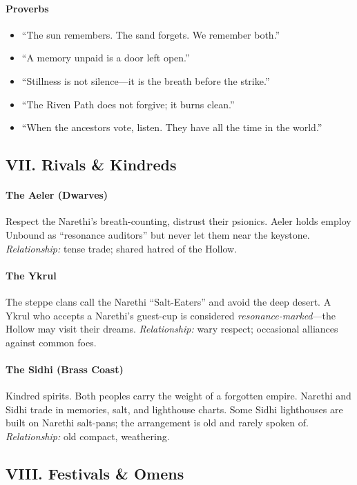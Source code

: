 \documentclass[11pt]{article}
\begin{document}
\paragraph{Proverbs}
\begin{itemize}[leftmargin=*,nosep]
    \item ``The sun remembers. The sand forgets. We remember both.''
    \item ``A memory unpaid is a door left open.''
    \item ``Stillness is not silence---it is the breath before the strike.''
    \item ``The Riven Path does not forgive; it burns clean.''
    \item ``When the ancestors vote, listen. They have all the time in the world.''
\end{itemize}

\subsection*{VII. Rivals \& Kindreds}
\paragraph{The Aeler (Dwarves)} Respect the Narethi's breath-counting, distrust their psionics. Aeler holds employ Unbound as ``resonance auditors'' but never let them near the keystone. \textit{Relationship:} tense trade; shared hatred of the Hollow.

\paragraph{The Ykrul} The steppe clans call the Narethi ``Salt-Eaters'' and avoid the deep desert. A Ykrul who accepts a Narethi's guest-cup is considered \textit{resonance-marked}---the Hollow may visit their dreams. \textit{Relationship:} wary respect; occasional alliances against common foes.

\paragraph{The Sidhi (Brass Coast)} Kindred spirits. Both peoples carry the weight of a forgotten empire. Narethi and Sidhi trade in memories, salt, and lighthouse charts. Some Sidhi lighthouses are built on Narethi salt-pans; the arrangement is old and rarely spoken of. \textit{Relationship:} old compact, weathering.

\subsection*{VIII. Festivals \& Omens}
\end{document}
